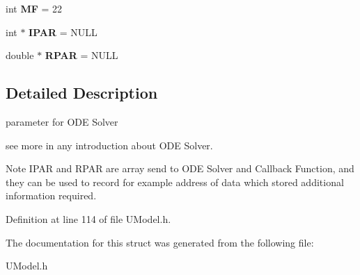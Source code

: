\begin{DoxyCompactItemize}
\item 
\mbox{\label{structUModel_1_1__ODEPAR_a2ea8e03f8db5564e1eadb921ee70f8ff}} 
int {\bfseries MF} = 22
\item 
\mbox{\label{structUModel_1_1__ODEPAR_aa840a6bd72e41aeb6d8300e68404216a}} 
int $\ast$ {\bfseries I\+P\+AR} = N\+U\+LL
\item 
\mbox{\label{structUModel_1_1__ODEPAR_a60121e6d6cfd33fa2acabd7d5cb2aa17}} 
double $\ast$ {\bfseries R\+P\+AR} = N\+U\+LL
\end{DoxyCompactItemize}


\subsection{Detailed Description}
parameter for O\+DE Solver 

see more in any introduction about O\+DE Solver. \begin{DoxyNote}{Note}
I\+P\+AR and R\+P\+AR are array send to O\+DE Solver and Callback Function, and they can be used to record for example address of data which stored additional information required. 
\end{DoxyNote}


Definition at line 114 of file U\+Model.\+h.



The documentation for this struct was generated from the following file\+:\begin{DoxyCompactItemize}
\item 
U\+Model.\+h\end{DoxyCompactItemize}
